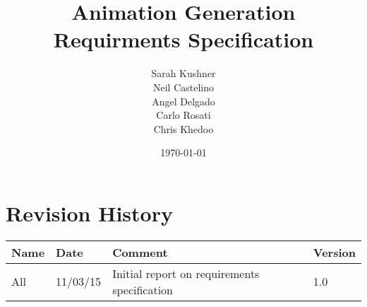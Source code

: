 \documentclass{article}
\begin{document}
\title{Animation Generation Requirments Specification}
\author{Sarah Kushner \\
		Neil Castelino \\
		Angel Delgado \\
		Carlo Rosati \\
		Chris Khedoo}
\date{\today}
\maketitle
\small

\pagebreak
\tableofcontents
\pagebreak
\section{Revision History}
\begin{tabular}{|l|l|l|l|}
\hline
Name	& Date	 		& 	Comment	 								& 	Version	 \\ \hline
All		& 11/03/15		& 	Initial report on requirements specification &  	1.0 	 \\ \hline
\end{tabular}

\pagebreak





\end{document}
